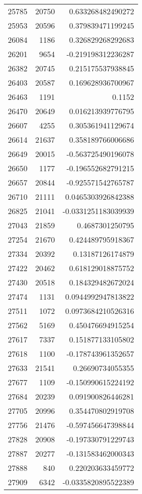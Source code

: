 \begin{tabular}{r | r | r}
25785 & 20750 & 0.633268482490272 \\
25953 & 20596 & 0.379839471199245 \\
26084 & 1186 & 0.326829268292683 \\
26201 & 9654 & -0.219198312236287 \\
26382 & 20745 & 0.215175537938845 \\
26403 & 20587 & 0.169628936700967 \\
26463 & 1191 & 0.1152 \\
26470 & 20649 & 0.016213939776795 \\
26607 & 4255 & 0.305361941129674 \\
26614 & 21637 & 0.358189766006686 \\
26649 & 20015 & -0.563725490196078 \\
26650 & 1177 & -0.196552682791215 \\
26657 & 20844 & -0.925571542765787 \\
26710 & 21111 & 0.0465303926842388 \\
26825 & 21041 & -0.0331251183039939 \\
27043 & 21859 & 0.4687301250795 \\
27254 & 21670 & 0.424489795918367 \\
27334 & 20392 & 0.13187126174879 \\
27422 & 20462 & 0.618129018875752 \\
27430 & 20518 & 0.184329482672024 \\
27474 & 1131 & 0.0944992947813822 \\
27511 & 1072 & 0.0973684210526316 \\
27562 & 5169 & 0.450476694915254 \\
27617 & 7337 & 0.151877133105802 \\
27618 & 1100 & -0.178743961352657 \\
27633 & 21541 & 0.26690734055355 \\
27677 & 1109 & -0.150990615224192 \\
27684 & 20239 & 0.091900826446281 \\
27705 & 20996 & 0.354470802919708 \\
27756 & 21476 & -0.597456647398844 \\
27828 & 20908 & -0.197330791229743 \\
27887 & 20277 & -0.131583462000343 \\
27888 & 840 & 0.220203633459772 \\
27909 & 6342 & -0.0335820895522389 \\

\end{tabular}

